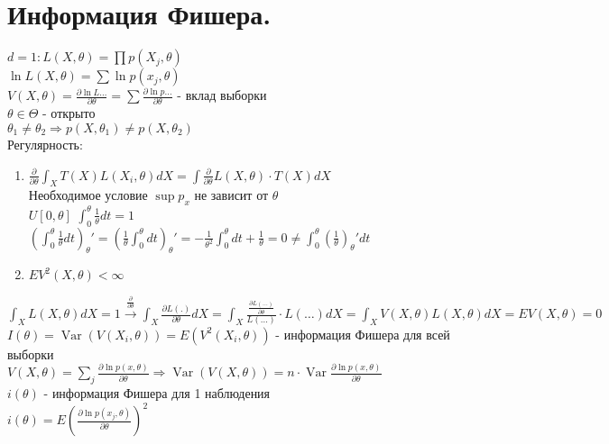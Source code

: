 \documentclass{article}
\newcommand\0{\mathbb{0}}
\DeclareMathOperator{\Var}{Var}
\newcommand\1{\mathbb{1}}
\begin{document}
\section{Информация Фишера.}
$d = 1: L(X, \theta) = \displaystyle\prod p(X_j, \theta)$\\
$\ln{L(X, \theta)} = \displaystyle\sum \ln{p(x_j, \theta)}$\\
$V(X, \theta) = \frac{\partial \ln{L\dots}}{\partial \theta} = \displaystyle\sum \frac{\partial \ln{p\dots}}{\partial \theta}$ - вклад выборки\\
$\theta \in \Theta$ - открыто\\
$\theta_1 \neq \theta_2 \Rightarrow p(X, \theta_1) \neq p(X, \theta_2)$\\
Регулярность:\\
\begin{enumerate}
    \item $\frac{\partial}{\partial \theta} \displaystyle\int_X T(X) L(X_i, \theta)dX = \displaystyle\int \frac{\partial}{\partial \theta}L(X, \theta) \cdot T(X) dX$\\
    Необходимое условие $\sup p_x$ не зависит от $\theta$\\
    $U[0, \theta]$ $\displaystyle\int_{0}^{\theta} \frac{1}{\theta}dt = 1$\\
    $(\displaystyle\int_0^{\theta} \frac{1}{\theta}dt)_{\theta}' = (\frac{1}{\theta}\displaystyle\int_0^\theta dt)_\theta' = -\frac{1}{\theta^2} \displaystyle\int_0^\theta dt + \frac{1}{\theta} = 0 \neq \displaystyle\int_0^\theta(\frac{1}{\theta})_\theta' dt$
    \item $EV^2(X, \theta) < \infty$
\end{enumerate}
$\displaystyle\int_X L(X, \theta)dX = 1 \xrightarrow[]{\frac{\partial}{\partial \theta}} \displaystyle\int_X \frac{\partial L(.)}{\partial \theta}dX = \displaystyle\int_X \frac{\frac{\partial L(\dots)}{\partial \theta}}{L(\dots)} \cdot L(\dots) dX = \displaystyle\int_X V(X, \theta) L(X, \theta) dX = EV(X, \theta) = 0$\\
$I(\theta) = \Var(V(X_i, \theta)) = E(V^2(X_i, \theta))$ - информация Фишера для всей выборки\\
$V(X, \theta) = \displaystyle\sum_j \frac{\partial \ln{p(x, \theta)}}{\partial \theta} \Rightarrow \Var(V(X, \theta)) = n \cdot \Var \frac{\partial \ln{p(x, \theta)}}{\partial \theta}$\\
$i(\theta)$ - информация Фишера для 1 наблюдения\\
$i(\theta) = E(\frac{\partial \ln{p(x_j, \theta)}}{\partial \theta})^2$\\
\end{document}

